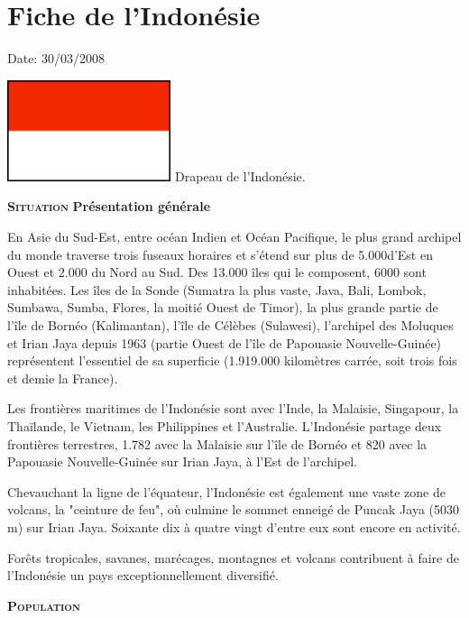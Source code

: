 \section{Fiche de l'Indonésie}

Date: 30/03/2008

\begin{multicols}{2}
\hspace*{-0.65cm}
\includegraphics[width=4.8cm]{articles/Fiche-de-l-indonesie/drapeauindonesie.png}
Drapeau de l'Indonésie.

\textbf{\textsc{Situation}}
\textbf{Présentation générale}

En Asie du Sud-Est, entre océan Indien et Océan Pacifique, le plus grand archipel du monde traverse trois fuseaux horaires et s'étend sur plus de 5.000\kilo\meter\squared d'Est en Ouest et 2.000 \kilo\meter\squared du Nord au Sud. Des 13.000 îles qui le composent, 6000 sont inhabitées. Les îles de la Sonde (Sumatra la plus vaste, Java, Bali, Lombok, Sumbawa, Sumba, Flores, la moitié Ouest de Timor), la plus grande partie de l'île de Bornéo (Kalimantan), l'île de Célèbes (Sulawesi), l'archipel des Moluques et Irian Jaya depuis 1963 (partie Ouest de l'île de Papouasie Nouvelle-Guinée) représentent l'essentiel de sa superficie (1.919.000 kilomètres carrée, soit trois fois et demie la France).

Les frontières maritimes de l'Indonésie sont avec l'Inde, la Malaisie, Singapour, la Thaïlande, le Vietnam, les Philippines et l'Australie. L'Indonésie partage deux frontières terrestres, 1.782 \kilo\meter\squared avec la Malaisie sur l'île de Bornéo et 820 \kilo\meter\squared avec la Papouasie Nouvelle-Guinée sur Irian Jaya, à l'Est de l'archipel.

Chevauchant la ligne de l'équateur, l'Indonésie est également une vaste zone de volcans, la "ceinture de feu", où culmine le sommet enneigé de Puncak Jaya (5030 m) sur Irian Jaya. Soixante dix à quatre vingt d'entre eux sont encore en activité.

Forêts tropicales, savanes, marécages, montagnes et volcans contribuent à faire de l'Indonésie un pays exceptionnellement diversifié.

\textbf{\textsc{Population}}


\end{multicols}
